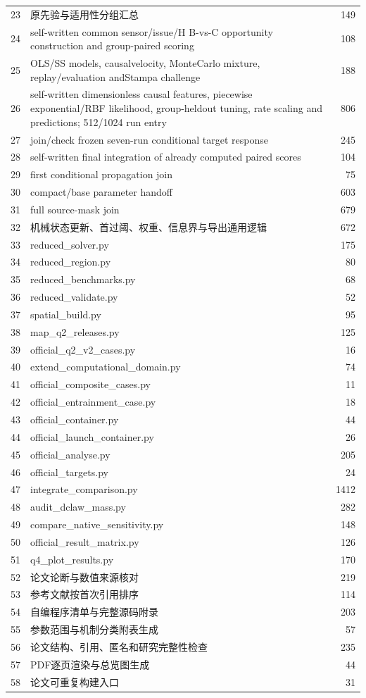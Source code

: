 \begin{longtable}{p{}p{}r}
23 & 原先验与适用性分组汇总 & 149\\
24 & self-written common sensor/issue/H B-vs-C opportunity construction and group-paired scoring & 108\\
25 & OLS/SS models, causalvelocity, MonteCarlo mixture, replay/evaluation andStampa challenge & 188\\
26 & self-written dimensionless causal features, piecewise exponential/RBF likelihood, group-heldout tuning, rate scaling and predictions; 512/1024 run entry & 806\\
27 & join/check frozen seven-run conditional target response & 245\\
28 & self-written final integration of already computed paired scores & 104\\
29 & first conditional propagation join & 75\\
30 & compact/base parameter handoff & 603\\
31 & full source-mask join & 679\\
32 & 机械状态更新、首过阈、权重、信息界与导出通用逻辑 & 672\\
33 & reduced\_solver.py & 175\\
34 & reduced\_region.py & 80\\
35 & reduced\_benchmarks.py & 68\\
36 & reduced\_validate.py & 52\\
37 & spatial\_build.py & 95\\
38 & map\_q2\_releases.py & 125\\
39 & official\_q2\_v2\_cases.py & 16\\
40 & extend\_computational\_domain.py & 74\\
41 & official\_composite\_cases.py & 11\\
42 & official\_entrainment\_case.py & 18\\
43 & official\_container.py & 44\\
44 & official\_launch\_container.py & 26\\
45 & official\_analyse.py & 205\\
46 & official\_targets.py & 24\\
47 & integrate\_comparison.py & 1412\\
48 & audit\_dclaw\_mass.py & 282\\
49 & compare\_native\_sensitivity.py & 148\\
50 & official\_result\_matrix.py & 126\\
51 & q4\_plot\_results.py & 170\\
52 & 论文论断与数值来源核对 & 219\\
53 & 参考文献按首次引用排序 & 114\\
54 & 自编程序清单与完整源码附录 & 203\\
55 & 参数范围与机制分类附表生成 & 57\\
56 & 论文结构、引用、匿名和研究完整性检查 & 235\\
57 & PDF逐页渲染与总览图生成 & 44\\
58 & 论文可重复构建入口 & 31\\
\bottomrule\end{longtable}
